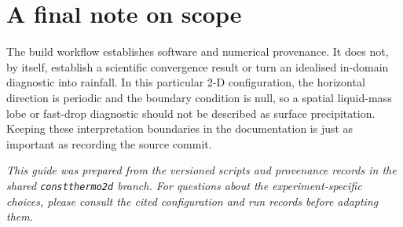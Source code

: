 \documentclass[11pt,a4paper]{article}
\begin{document}
\section{A final note on scope}

The build workflow establishes software and numerical provenance. It does not, by itself, establish a scientific convergence result or turn an idealised in-domain diagnostic into rainfall. In this particular 2-D configuration, the horizontal direction is periodic and the boundary condition is null, so a spatial liquid-mass lobe or fast-drop diagnostic should not be described as surface precipitation. Keeping these interpretation boundaries in the documentation is just as important as recording the source commit.

\vfill
\noindent\textit{This guide was prepared from the versioned scripts and provenance records in the shared \texttt{constthermo2d} branch. For questions about the experiment-specific choices, please consult the cited configuration and run records before adapting them.}
\end{document}
